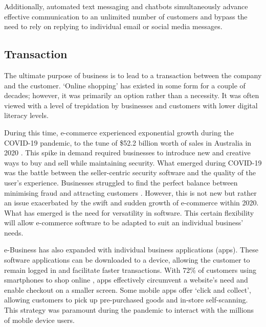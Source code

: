 \documentclass[a0,portrait]{a0poster}
\begin{document}
\begin{multicols}{2}
Additionally, automated text messaging and chatbots simultaneously advance effective communication to an unlimited number of customers and bypass the need to rely on replying to individual email or social media messages. \par

\subsection*{Transaction}
The ultimate purpose of business is to lead to a transaction between the company and the customer. ‘Online shopping’ has existed in some form for a couple of decades; however, it was primarily an option rather than a necessity. It was often viewed with a level of trepidation by businesses and customers with lower digital literacy levels. \par 
During this time, e-commerce experienced exponential growth during the COVID-19 pandemic, to the tune of \$52.2 billion worth of sales in Australia in 2020 \cite{knowles}. This spike in demand required businesses to introduce new and creative ways to buy and sell while maintaining security. What emerged during COVID-19 was the battle between the seller-centric security software and the quality of the user’s experience. Businesses struggled to find the perfect balance between minimising fraud and attracting customers \cite{kemp}. However, this is not new but rather an issue exacerbated by the swift and sudden growth of e-commerce within 2020. What has emerged is the need for versatility in software. This certain flexibility will allow e-commerce software to be adapted to suit an individual business’ needs. \par 

e-Business has also expanded with individual business applications (apps). These software applications can be downloaded to a device, allowing the customer to remain logged in and facilitate faster transactions. With 72\% of customers using smartphones to shop online \cite{columbus}, apps effectively circumvent a website’s need and enable checkout on a smaller screen. Some mobile apps offer ‘click and collect’, allowing customers to pick up pre-purchased goods and in-store self-scanning. This strategy was paramount during the pandemic to interact with the millions of mobile device users. \par



\end{multicols}
\end{document}
